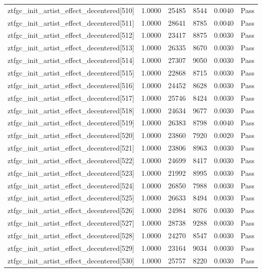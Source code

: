 \begin{table}[htbp]
\begin{tabular}{llrrll}
ztfgc\_init\_artist\_effect\_decentered[510] & 1.0000 & 25485 & 8544 & 0.0040 & Pass \\
ztfgc\_init\_artist\_effect\_decentered[511] & 1.0000 & 28641 & 8785 & 0.0040 & Pass \\
ztfgc\_init\_artist\_effect\_decentered[512] & 1.0000 & 23417 & 8875 & 0.0030 & Pass \\
ztfgc\_init\_artist\_effect\_decentered[513] & 1.0000 & 26335 & 8670 & 0.0030 & Pass \\
ztfgc\_init\_artist\_effect\_decentered[514] & 1.0000 & 27307 & 9050 & 0.0030 & Pass \\
ztfgc\_init\_artist\_effect\_decentered[515] & 1.0000 & 22868 & 8715 & 0.0030 & Pass \\
ztfgc\_init\_artist\_effect\_decentered[516] & 1.0000 & 24452 & 8628 & 0.0030 & Pass \\
ztfgc\_init\_artist\_effect\_decentered[517] & 1.0000 & 25746 & 8424 & 0.0030 & Pass \\
ztfgc\_init\_artist\_effect\_decentered[518] & 1.0000 & 24634 & 9677 & 0.0030 & Pass \\
ztfgc\_init\_artist\_effect\_decentered[519] & 1.0000 & 26383 & 8798 & 0.0040 & Pass \\
ztfgc\_init\_artist\_effect\_decentered[520] & 1.0000 & 23860 & 7920 & 0.0020 & Pass \\
ztfgc\_init\_artist\_effect\_decentered[521] & 1.0000 & 23806 & 8963 & 0.0030 & Pass \\
ztfgc\_init\_artist\_effect\_decentered[522] & 1.0000 & 24699 & 8417 & 0.0030 & Pass \\
ztfgc\_init\_artist\_effect\_decentered[523] & 1.0000 & 21992 & 8995 & 0.0030 & Pass \\
ztfgc\_init\_artist\_effect\_decentered[524] & 1.0000 & 26850 & 7988 & 0.0030 & Pass \\
ztfgc\_init\_artist\_effect\_decentered[525] & 1.0000 & 26633 & 8494 & 0.0030 & Pass \\
ztfgc\_init\_artist\_effect\_decentered[526] & 1.0000 & 24984 & 8076 & 0.0030 & Pass \\
ztfgc\_init\_artist\_effect\_decentered[527] & 1.0000 & 28738 & 9288 & 0.0030 & Pass \\
ztfgc\_init\_artist\_effect\_decentered[528] & 1.0000 & 24270 & 8547 & 0.0030 & Pass \\
ztfgc\_init\_artist\_effect\_decentered[529] & 1.0000 & 23164 & 9034 & 0.0030 & Pass \\
ztfgc\_init\_artist\_effect\_decentered[530] & 1.0000 & 25757 & 8220 & 0.0030 & Pass \\

\end{tabular}
\end{table}
